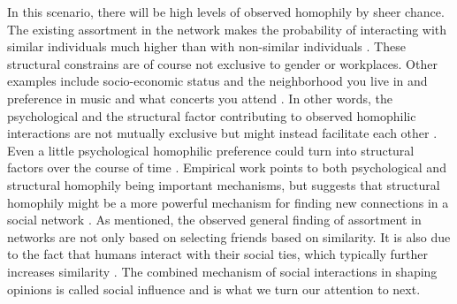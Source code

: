 \documentclass{article}
\begin{document}
In this scenario, there will be high levels of observed homophily by sheer chance. The existing assortment in the network makes the probability of interacting with similar individuals much higher than with non-similar individuals \cite{peixoto_disentangling_2022}. These structural constrains are of course not exclusive to gender or workplaces. Other examples include socio-economic status and the neighborhood you live in and preference in music and what concerts you attend \cite{mcpherson_birds_2001}. In other words, the psychological and the structural factor contributing to observed homophilic interactions are not mutually exclusive but might instead facilitate each other \cite{asikainen_cumulative_2020}. Even a little psychological homophilic preference could turn into structural factors over the course of time \cite{asikainen_cumulative_2020,kossinets_origins_2009,taylor_exploring_2018}. Empirical work points to both psychological and structural homophily being important mechanisms, but suggests that structural homophily might be a more powerful mechanism for finding new connections in a social network \cite{bener_empirical_2016,kossinets_origins_2009}.
As mentioned, the observed general finding of assortment in networks are not only based on selecting friends based on similarity. It is also due to the fact that humans interact with their social ties, which typically further increases similarity \cite{friedkin_social_1990,spears_social_2021}. The combined mechanism of social interactions in shaping opinions is called social influence and is what we turn our attention to next. 
\end{document}
